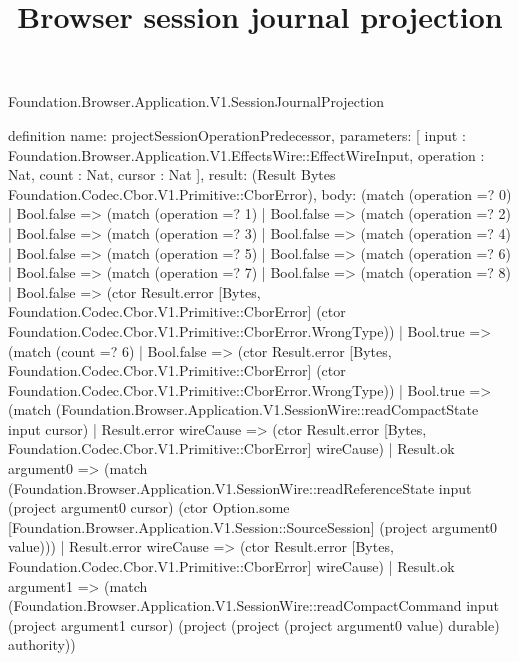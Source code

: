 \begin{lexlean}{Foundation.Browser.Application.V1.SessionJournalProjection}
\title{Browser session journal projection}
\begin{semanticmodule}
definition{
  name: projectSessionOperationPredecessor,
  parameters: [
    input : Foundation.Browser.Application.V1.EffectsWire::EffectWireInput,
    operation : Nat,
    count : Nat,
    cursor : Nat
  ],
  result: (Result Bytes Foundation.Codec.Cbor.V1.Primitive::CborError),
  body: (match (operation =? 0)
    | Bool.false => (match (operation =? 1)
      | Bool.false => (match (operation =? 2)
        | Bool.false => (match (operation =? 3)
          | Bool.false => (match (operation =? 4)
            | Bool.false => (match (operation =? 5)
              | Bool.false => (match (operation =? 6)
                | Bool.false => (match (operation =? 7)
                  | Bool.false => (match (operation =? 8)
                    | Bool.false => (ctor Result.error [Bytes, Foundation.Codec.Cbor.V1.Primitive::CborError] (ctor Foundation.Codec.Cbor.V1.Primitive::CborError.WrongType))
                    | Bool.true => (match (count =? 6)
                      | Bool.false => (ctor Result.error [Bytes, Foundation.Codec.Cbor.V1.Primitive::CborError] (ctor Foundation.Codec.Cbor.V1.Primitive::CborError.WrongType))
                      | Bool.true => (match (Foundation.Browser.Application.V1.SessionWire::readCompactState input cursor)
                        | Result.error wireCause => (ctor Result.error [Bytes, Foundation.Codec.Cbor.V1.Primitive::CborError] wireCause)
                        | Result.ok argument0 => (match (Foundation.Browser.Application.V1.SessionWire::readReferenceState input (project argument0 cursor) (ctor Option.some [Foundation.Browser.Application.V1.Session::SourceSession] (project argument0 value)))
                          | Result.error wireCause => (ctor Result.error [Bytes, Foundation.Codec.Cbor.V1.Primitive::CborError] wireCause)
                          | Result.ok argument1 => (match (Foundation.Browser.Application.V1.SessionWire::readCompactCommand input (project argument1 cursor) (project (project (project argument0 value) durable) authority))
}
\end{semanticmodule}
\end{lexlean}

